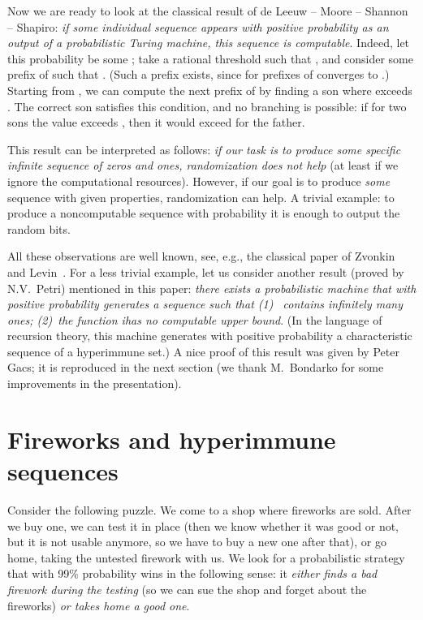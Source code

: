 \documentclass[12pt]{article}
\begin{document}
Now we are ready to look at the classical result of de Leeuw -- Moore -- Shannon -- Shapiro: \emph{if some individual sequence  appears with positive probability as an output of a probabilistic Turing machine, this sequence is computable}. Indeed, let this probability be some ; take a rational threshold  such that , and consider some prefix  of  such that . (Such a prefix exists, since  for prefixes of  converges to .)
Starting from , we can compute the next prefix of  by finding a son where  exceeds . The correct son satisfies this condition, and no branching is possible: if for two sons the value exceeds , then it would exceed  for the father.

This result can be interpreted as follows: \emph{if our task is to produce some specific infinite sequence of zeros and ones, randomization does not help} (at least if we ignore the computational resources). However, if our goal is to produce \emph{some} sequence with given properties, randomization can help. A trivial example: to produce a noncomputable sequence with probability  it is enough to output the random bits.

All these observations are well known, see, e.g., the classical paper of Zvonkin and Levin~\cite{zvonkin-levin}. For a less trivial example, let us consider another result (proved by N.V.~Pet\-ri) mentioned in this paper: \emph{there exists a probabilistic machine that with positive probability generates a sequence  such that \textup{(1)}~ contains infinitely many ones; \textup{(2)}~the function i\omega has no computable upper bound}. (In the language of recursion theory, this machine generates with positive probability a characteristic sequence of a hyperimmune set.) A nice proof of this result was given by Peter Gacs; it is reproduced in the next section (we thank M.~Bondarko for some improvements in the presentation).

\section{Fireworks and hyperimmune sequences}

Consider the following puzzle. We come to a shop where fireworks are sold. After we buy one, we can test it in place (then we know whether it was good or not, but it is not usable anymore, so we have to buy a new one after that), or go home, taking the untested firework with us. We look for a probabilistic strategy that with 99\% probability wins in the following sense: it \emph{either finds a bad firework during the testing} (so we can sue the shop and forget about the fireworks) \emph{or takes home a good one}.
\end{document}

